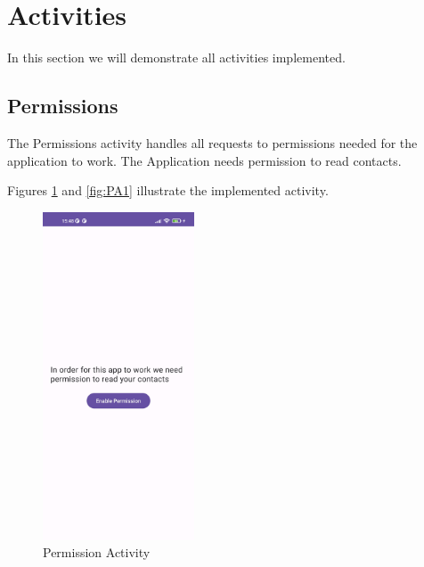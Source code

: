 \newpage


\section{Activities}
In this section we will demonstrate all activities implemented.
\subsection{Permissions}
The Permissions activity handles all requests to permissions needed for the application to work.
The Application needs permission to read contacts.

Figures \ref{fig:PA} and \ref{fig:PA1} illustrate the implemented activity. 

\begin{figure}[!ht]
	\centering
	\includegraphics[trim={0cm 0cm 0 0cm}, width=0.4\textwidth]{./Chapter6/Figures/Permission}
	\caption{Permission Activity}
	\label{fig:PA}
\end{figure}


